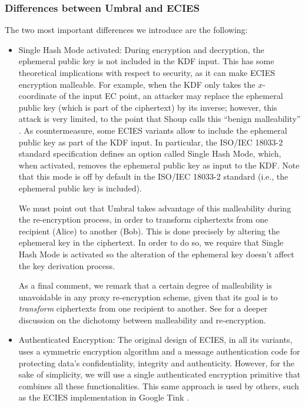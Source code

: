 \documentclass[12pt]{article}
\begin{document}

\subsubsection{Differences between Umbral and ECIES}

The two most important differences we introduce are the following:

\begin{itemize}

\item Single Hash Mode activated: 
During encryption and decryption, the ephemeral public key is not included in the KDF input. This has some theoretical implications with respect to security, as it can make ECIES encryption malleable. For example, when the KDF only takes the $x$-coordinate of the input EC point, an attacker may replace the ephemeral public key (which is part of the ciphertext) by its inverse; however, this attack is very limited, to the point that Shoup calls this ``benign malleability'' \cite{shoup}. As countermeasure, some ECIES variants allow to include the ephemeral public key as part of the KDF input. In particular, the ISO/IEC 18033-2 standard specification defines an option called Single Hash Mode, which, when activated, removes the ephemeral public key as input to the KDF. Note that this mode is off by default in the ISO/IEC 18033-2 standard (i.e., the ephemeral public key is included).

We must point out that Umbral takes advantage of this malleability during the re-encryption process, in order to transform ciphertexts from one recipient (Alice) to another (Bob). This is done precisely by altering the ephemeral key in the ciphertext. In order to do so, we require that Single Hash Mode is activated so the alteration of the ephemeral key doesn't affect the key derivation process. 

As a final comment, we remark that a certain degree of malleability is unavoidable in any proxy re-encryption scheme, given that its goal is to \emph{transform} ciphertexts from one recipient to another. See \cite{canetti2007chosen} for a deeper discussion on the dichotomy between malleability and re-encryption.


\item Authenticated Encryption: The original design of ECIES, in all its variants, uses a symmetric encryption algorithm and a message authentication code for protecting data's confidentiality, integrity and authenticity. However, for the sake of simplicity, we will use a single authenticated encryption primitive that combines all these functionalities. This same approach is used by others, such as the ECIES implementation in Google Tink \cite{tink}. 

\end{itemize}
\end{document}
